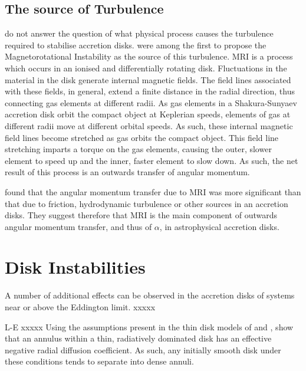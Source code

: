 \subsection{The source of Turbulence}

\par \citet{Shakura_Disk} do not answer the question of what physical process causes the turbulence required to stabilise accretion disks.  \citet{Balbus_MRI} were among the first to propose the Magnetorotational Instability \citep[MRI,][]{Velikhov_MRI,Chandrasekhar_MRI} as the source of this turbulence.  MRI is a process which occurs in an ionised and differentially rotating disk.  Fluctuations in the material in the disk generate internal magnetic fields.  The field lines associated with these fields, in general, extend a finite distance in the radial direction, thus connecting gas elements at different radii.  As gas elements in a Shakura-Sunyaev accretion disk orbit the compact object at Keplerian speeds, elements of gas at different radii move at different orbital speeds.  As such, these internal magnetic field lines become stretched as gas orbits the compact object.  This field line stretching imparts a torque on the gas elements, causing the outer, slower element to speed up and the inner, faster element to slow down.  As such, the net result of this process is an outwards transfer of angular momentum.
\par \citet{Balbus_MRI} found that the angular momentum transfer due to MRI was more significant than that due to friction, hydrodynamic turbulence or other sources in an accretion disks.  They suggest therefore that MRI is the main component of outwards angular momentum transfer, and thus of $\alpha$, in astrophysical accretion disks.

\section{Disk Instabilities}

\par A number of additional effects can be observed in the accretion disks of systems near or above the Eddington limit. xxxxx

\label{sec:diskinstab}

L-E xxxxx Using the assumptions present in the thin disk models of \citealp{Shakura_Disk} and \citealp{Novikov_Torque}, \citealp{Lightman_Instability} show that an annulus within a thin, radiatively dominated disk has an effective negative radial diffusion coefficient.  As such, any initially smooth disk under these conditions tends to separate into dense annuli.

